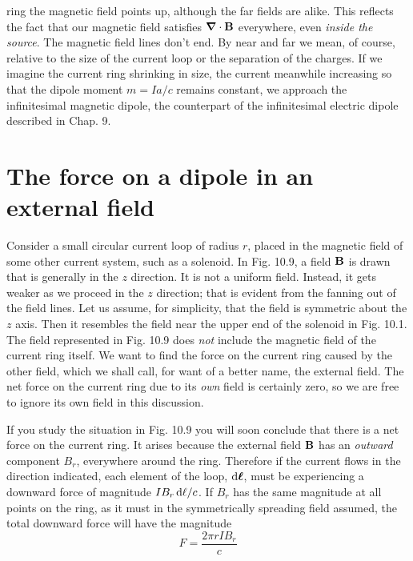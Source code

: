 ring the magnetic field points up, although the far fields are alike.
This reflects the fact that our magnetic field satisfies $\boldsymbol{\nabla}\cdot\mathbf{B}$
everywhere, even \emph{inside the source}. The magnetic field lines don't end.
By near and far we mean, of course, relative to the size of the current
loop or the separation of the charges. If we imagine the current ring
shrinking in size, the current meanwhile increasing so that the dipole
moment $m = Ia/c$ remains constant, we approach the infinitesimal
magnetic dipole, the counterpart of the infinitesimal electric dipole
described in Chap. 9.

\section{The force on a dipole in an external field}

Consider a small circular current loop of radius $r$, placed in the
magnetic field of some other current system, such as a solenoid. In
Fig. 10.9, a field $\mathbf{B}$ is drawn that is generally in the $z$ direction. It is
not a uniform field. Instead, it gets weaker as we proceed in the
$z$ direction; that is evident from the fanning out of the field lines.
Let us assume, for simplicity, that the field is symmetric about the
$z$ axis. Then it resembles the field near the upper end of the solenoid
in Fig. 10.1. The field represented in Fig. 10.9 does \emph{not} include the
magnetic field of the current ring itself. We want to find the force
on the current ring caused by the other field, which we shall call, for
want of a better name, the external field. The net force on the current
ring due to its \emph{own} field is certainly zero, so we are free to ignore
its own field in this discussion.

If you study the situation in Fig. 10.9 you will soon conclude that
there is a net force on the current ring. It arises because the external
field $\mathbf{B}$ has an \emph{outward} component $B_r$, everywhere around the ring.
Therefore if the current flows in the direction indicated, each element
of the loop, $\operatorname{d\!}\boldsymbol{\ell}$, must be experiencing a downward force of magnitude
$I B_r\operatorname{d\!}\ell/c$. If $B_r$ has the same magnitude at all points on the
ring, as it must in the symmetrically spreading field assumed, the
total downward force will have the magnitude
\begin{equation}
  F = \frac{2\pi r I B_r}{c}
\end{equation}


